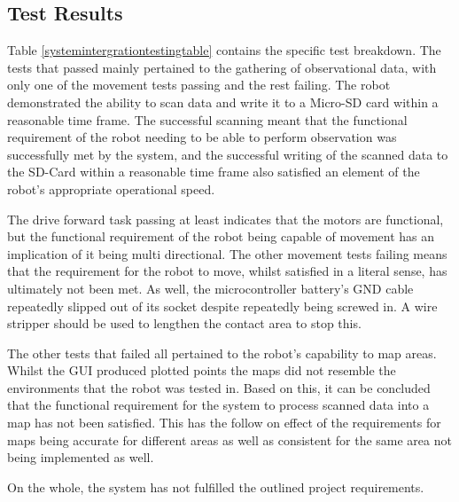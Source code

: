 			\subsection{Test Results}
			Table \ref{systemintergrationtestingtable} contains the specific test breakdown. The tests that passed mainly pertained to the gathering of observational data, with only one of the movement tests passing and the rest failing. The robot demonstrated the ability to scan data and write it to a Micro-SD card within a reasonable time frame. The successful scanning meant that the functional requirement of the robot needing to be able to perform observation was successfully met by the system, and the successful writing of the scanned data to the SD-Card within a reasonable time frame also satisfied an element of the robot's appropriate operational speed. 
				
			The drive forward task passing at least indicates that the motors are functional, but the functional requirement of the robot being capable of movement has an implication of it being multi directional. The other movement tests failing means that the requirement for the robot to move, whilst satisfied in a literal sense, has ultimately not been met. As well, the microcontroller battery's GND cable repeatedly slipped out of its socket despite repeatedly being screwed in. A wire stripper should be used to lengthen the contact area to stop this.
				
			The other tests that failed all pertained to the robot's capability to map areas. Whilst the GUI produced plotted points the maps did not resemble the environments that the robot was tested in. Based on this, it can be concluded that the functional requirement for the system to process scanned data into a map has not been satisfied. This has the follow on effect of the requirements for maps being accurate for different areas as well as consistent for the same area not being implemented as well.
			
			On the whole, the system has not fulfilled the outlined project requirements.
				